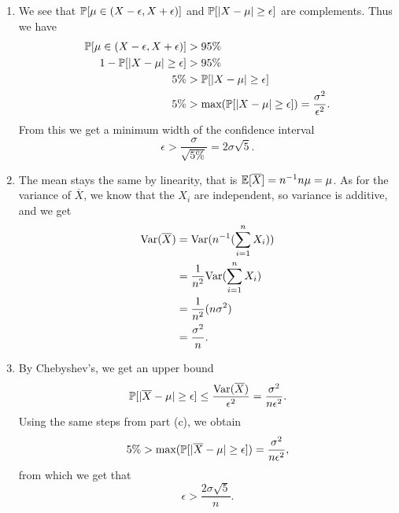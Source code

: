 \begin{enumerate}
\begin{enumerate}
        \item We see that $\P[\mu \in (X - \epsilon, X + \epsilon)]$ and $\P[|X - \mu| \geq \epsilon]$ are complements. Thus we have
        \begin{align*}
            \P[\mu \in (X - \epsilon, X + \epsilon)] &> 95\% \\
            1 - \P[|X - \mu| \geq \epsilon] &> 95\% \\
            5\% &> \P[|X - \mu| \geq \epsilon] \\
            5\% &> \f{max}(\P[|X - \mu| \geq \epsilon]) = \frac{\sigma^2}{\epsilon^2}.
        \end{align*}
        From this we get a minimum width of the confidence interval
        \[
        \epsilon > \frac{\sigma}{\sqrt{5\%}} = 2\sigma\sqrt{5}.
        \]
        
        \item The mean stays the same by linearity, that is $\E[\overline{X}] = n^{-1}n\mu = \mu$. As for the variance of $\overline{X}$, we know that the $X_i$ are independent, so variance is additive, and we get
        \begin{align*}
            \f{Var}(\overline{X}) &= \f{Var}(n^{-1}(\sum_{i = 1}^n X_i)) \\
                &= \frac{1}{n^2}\f{Var}(\sum_{i = 1}^n X_i) \\
                &= \frac{1}{n^2}(n\sigma^2) \\
                &= \frac{\sigma^2}{n}.
        \end{align*}
        
        \item By Chebyshev's, we get an upper bound
        \[
        \P[|\overline{X} - \mu| \geq \epsilon] \leq \frac{\f{Var}(\overline{X})}{\epsilon^2} = \frac{\sigma^2}{n\epsilon^2}.
        \]
        Using the same steps from part (c), we obtain 
        \[
        5\% > \f{max}(\P[|\overline{X} - \mu| \geq \epsilon]) = \frac{\sigma^2}{n\epsilon^2},
        \]
        from which we get that
        \[
        \epsilon > \frac{2\sigma\sqrt{5}}{n}.
        \]
    \end{enumerate}
\end{enumerate}